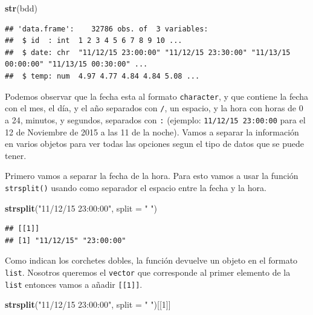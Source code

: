 \documentclass[
]{book}
\newenvironment{Shaded}{\begin{snugshade}}{\end{snugshade}}
\newcommand{\DataTypeTok}[1]{\textcolor[rgb]{0.13,0.29,0.53}{#1}}
\newcommand{\DecValTok}[1]{\textcolor[rgb]{0.00,0.00,0.81}{#1}}
\newcommand{\KeywordTok}[1]{\textcolor[rgb]{0.13,0.29,0.53}{\textbf{#1}}}
\newcommand{\NormalTok}[1]{#1}
\newcommand{\StringTok}[1]{\textcolor[rgb]{0.31,0.60,0.02}{#1}}
\begin{document}
\begin{Shaded}
\begin{Highlighting}[]
\KeywordTok{str}\NormalTok{(bdd)}
\end{Highlighting}
\end{Shaded}

\begin{verbatim}
## 'data.frame':    32786 obs. of  3 variables:
##  $ id  : int  1 2 3 4 5 6 7 8 9 10 ...
##  $ date: chr  "11/12/15 23:00:00" "11/12/15 23:30:00" "11/13/15 00:00:00" "11/13/15 00:30:00" ...
##  $ temp: num  4.97 4.77 4.84 4.84 5.08 ...
\end{verbatim}

Podemos observar que la fecha esta al formato \texttt{character}, y que contiene la fecha con el mes, el día, y el año separados con \texttt{/}, un espacio, y la hora con horas de 0 a 24, minutos, y segundos, separados con \texttt{:} (ejemplo: \texttt{11/12/15\ 23:00:00} para el 12 de Noviembre de 2015 a las 11 de la noche). Vamos a separar la información en varios objetos para ver todas las opciones segun el tipo de datos que se puede tener.

Primero vamos a separar la fecha de la hora. Para esto vamos a usar la función \texttt{strsplit()} usando como separador el espacio entre la fecha y la hora.

\begin{Shaded}
\begin{Highlighting}[]
\KeywordTok{strsplit}\NormalTok{(}\StringTok{"11/12/15 23:00:00"}\NormalTok{, }\DataTypeTok{split =} \StringTok{" "}\NormalTok{)}
\end{Highlighting}
\end{Shaded}

\begin{verbatim}
## [[1]]
## [1] "11/12/15" "23:00:00"
\end{verbatim}

Como indican los corchetes dobles, la función devuelve un objeto en el formato \texttt{list}. Nosotros queremos el \texttt{vector} que corresponde al primer elemento de la \texttt{list} entonces vamos a añadir \texttt{{[}{[}1{]}{]}}.

\begin{Shaded}
\begin{Highlighting}[]
\KeywordTok{strsplit}\NormalTok{(}\StringTok{"11/12/15 23:00:00"}\NormalTok{, }\DataTypeTok{split =} \StringTok{" "}\NormalTok{)[[}\DecValTok{1}\NormalTok{]]}
\end{Highlighting}
\end{Shaded}
\end{document}
